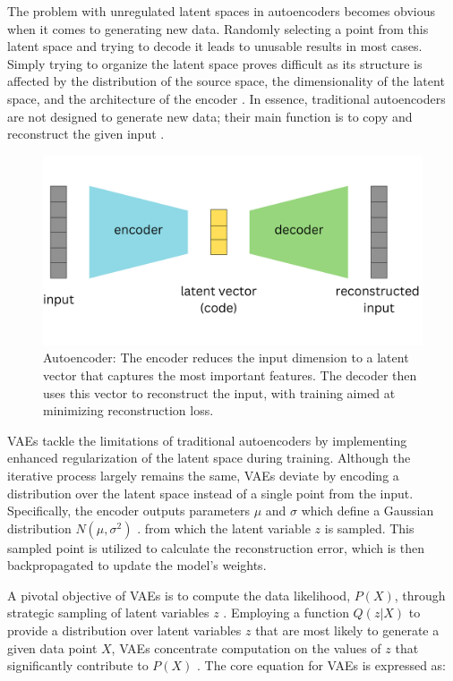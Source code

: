 The problem with unregulated latent spaces in autoencoders becomes obvious when it comes to generating new data. Randomly selecting a point from this latent space and trying to decode it leads to unusable results in most cases. Simply trying to organize the latent space proves difficult as its structure is affected by the distribution of the source space, the dimensionality of the latent space, and the architecture of the encoder \citep{michelucci2022introduction}.
In essence, traditional autoencoders are not designed to generate new data; their main function is to copy and reconstruct the given input \citep{GoodfellowDeepLearning}.

\begin{figure}[ht]
    \centering
      \hspace{.8cm}
      \includegraphics[width=.7\columnwidth]{figures/Autoencoder.png}
      \caption{Autoencoder: The encoder reduces the input dimension to a latent vector that captures the most important features. The decoder then uses this vector to reconstruct the input, with training aimed at minimizing reconstruction loss.}
      \label{fig:figureAE}
\end{figure}

VAEs tackle the limitations of traditional autoencoders by implementing enhanced regularization of the latent space during training. Although the iterative process largely remains the same, VAEs deviate by encoding a distribution over the latent space instead of a single point from the input. Specifically, the encoder outputs parameters \(\mu\) and \(\sigma\) which define a Gaussian distribution \(N(\mu, \sigma^2)\) \citep{doerschVAE}. from which the latent variable \(z\) is sampled. This sampled point is utilized to calculate the reconstruction error, which is then backpropagated to update the model's weights.

A pivotal objective of VAEs is to compute the data likelihood, \(P(X)\), through strategic sampling of latent variables \(z\) \citep{doerschVAE}. Employing a function \(Q(z|X)\) to provide a distribution over latent variables \(z\) that are most likely to generate a given data point \(X\), VAEs concentrate computation on the values of \(z\) that significantly contribute to \(P(X)\) \citep{doerschVAE}. The core equation for VAEs is expressed as:

